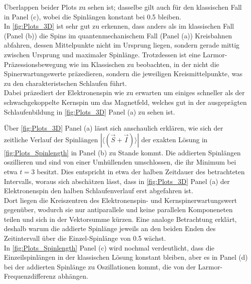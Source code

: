 Überlappen beider Plots zu sehen ist; dasselbe gilt auch für den klassischen Fall in Panel (c), wobei die Spinlängen konstant bei 0.5 bleiben.\\
In \autoref{fig:Plots_3D} ist sehr gut zu erkennen, dass anders als im klassischen Fall (Panel (b)) die Spins im quantenmechanischem Fall (Panel (a)) 
Kreisbahnen abfahren, dessen Mittelpunkte nicht im Ursprung liegen, sondern gerade mittig zwischen Ursprung und maximaler Spinlänge. Trotzdessen ist eine Larmor-Präzessionsbewegung wie im Klassischen 
zu beobachten, in der nicht die Spinerwartungswerte präzedieren, sondern die jeweiligen Kreismittelpunkte, was zu den charakteristschen Schlaufen führt.\\
Dabei präzediert der Elektronenspin wie zu erwarten um einiges schneller als der schwachgekoppelte Kernspin um das Magnetfeld, welches gut in der 
ausgeprägten Schlaufenbildung in \autoref{fig:Plots_3D} Panel (a) zu sehen ist. 

Über \autoref{fig:Plots_3D} Panel (a) lässt sich anschaulich erklären, wie sich der zeitliche Verlauf der 
Spinlängen $|\langle \left( \vec{S}+\vec{I} \right)\rangle |$ der exakten Lösung in \autoref{fig:Plots_Spinlength} in Panel (b) zu Stande kommt. Die 
addierten Spinlängen oszillieren und sind von einer Umhüllenden umschlossen, die ihr Minimum bei etwa $t=3$ besitzt. Dies entspricht in etwa der halben Zeitdauer
des betrachteten Intervalls, woraus sich abschätzen lässt, dass in \autoref{fig:Plots_3D} Panel (a) der Elektronenspin den halben Schlaufenverlauf erst 
abgefahren ist. \\
Dort liegen die Kreiszentren des Elektronenspin- und Kernspinerwartungswert gegenüber, wodurch sie nur antiparallele
und keine parallelen Komponeneten teilen und sich in der Vektorsumme kürzen. Eine analoge Betrachtung erklärt, deshalb warum die addierte Spinlänge
jeweils an den beiden Enden des Zeitintervall über die Einzel-Spinlänge von 0.5 wächst.\\
In \autoref{fig:Plots_Spinlength} Panel (c) wird nochmal verdeutlicht, dass die Einzeilspinlängen in der klassischen Lösung konstant bleiben, aber es in 
Panel (d) bei der addierten Spinlänge zu Oszillationen kommt, die von der Larmor-Frequenzdifferenz abhängen. 
